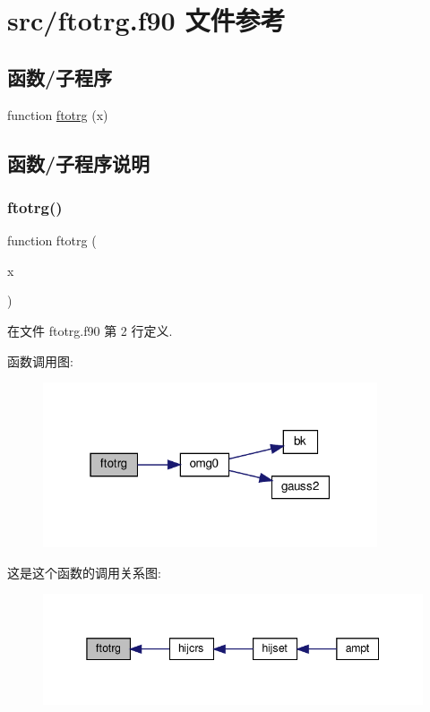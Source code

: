 \hypertarget{ftotrg_8f90}{}\section{src/ftotrg.f90 文件参考}
\label{ftotrg_8f90}
\subsection*{函数/子程序}
\begin{DoxyCompactItemize}
\item 
function \mbox{\hyperlink{ftotrg_8f90_aada6380d32e972f5ad461bacfcbd9192}{ftotrg}} (x)
\end{DoxyCompactItemize}


\subsection{函数/子程序说明}
\mbox{\label{ftotrg_8f90_aada6380d32e972f5ad461bacfcbd9192}} 
\subsubsection{\texorpdfstring{ftotrg()}{ftotrg()}}
{\footnotesize\ttfamily function ftotrg (\begin{DoxyParamCaption}\item[{}]{x }\end{DoxyParamCaption})}



在文件 ftotrg.\+f90 第 2 行定义.

函数调用图\+:
\nopagebreak
\begin{figure}[H]
\begin{center}
\leavevmode
\includegraphics[width=280pt]{ftotrg_8f90_aada6380d32e972f5ad461bacfcbd9192_cgraph}
\end{center}
\end{figure}
这是这个函数的调用关系图\+:
\nopagebreak
\begin{figure}[H]
\begin{center}
\leavevmode
\includegraphics[width=345pt]{ftotrg_8f90_aada6380d32e972f5ad461bacfcbd9192_icgraph}
\end{center}
\end{figure}
